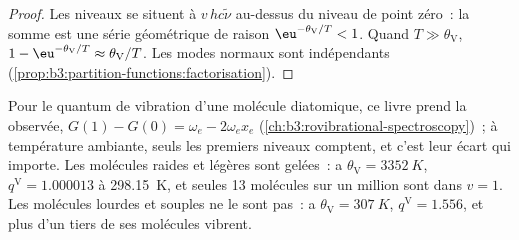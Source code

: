 \begin{proof}
Les niveaux se situent à $v\,hc\tilde\nu$ au-dessus du niveau de point
zéro~: la somme est une série géométrique
de raison $\eu^{-\theta_{\mathrm V}/T} < 1$. Quand $T \gg \theta_{\mathrm V}$, $1 - \eu^{-\theta_{\mathrm V}/T} \approx \theta_{\mathrm V}/T$.
Les modes normaux sont indépendants
(\cref{prop:b3:partition-functions:factorisation}).
\end{proof}

Pour le quantum de vibration d'une molécule diatomique, ce livre prend la
 observée, $G(1) - G(0) = \omega_e - 2\omega_ex_e$
(\cref{ch:b3:rovibrational-spectroscopy})~; à température ambiante,
seuls les premiers niveaux comptent, et c'est leur écart qui importe.
Les molécules raides et légères sont gelées~:  a
$\theta_{\mathrm V} = \qty{3352}{K}$, $q^{\mathrm V} = 1.000013$ à
\qty{298.15}{K}, et seules 13 molécules sur un million sont dans
$v = 1$. Les molécules lourdes et souples ne le sont pas~: 
a $\theta_{\mathrm V} = \qty{307}{K}$, $q^{\mathrm V} = 1.556$, et plus
d'un tiers de ses molécules vibrent.

